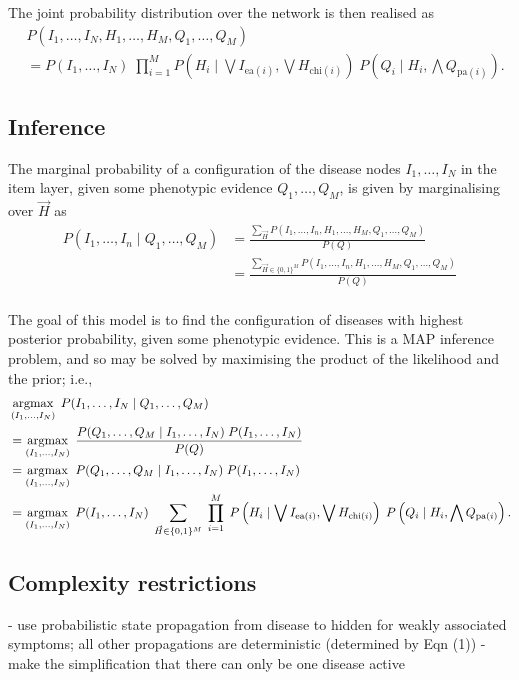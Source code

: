 The joint probability distribution over the network is then realised as
\begin{align}
    &P(I_1, \hdots, I_N, H_1, \hdots, H_M, Q_1, \hdots, Q_M) \nonumber\\
    &=  P(I_1, \hdots, I_N) 
    \; \prod_{i=1}^M P\left(H_i \mid \bigvee I_{\text{ea}(i)}, \bigvee H_{\text{chi}(i)}\right)
    \; P\left(Q_i \mid H_i, \bigwedge Q_{\text{pa}(i)}\right). \label{eq:joint}
\end{align}

\subsection*{Inference}

The marginal probability of a configuration of the disease nodes $I_1, \hdots, I_N$ in the item layer, given some phenotypic evidence $Q_1, \hdots, Q_M$, is given by marginalising over $\vec{H}$ as
\begin{align*}
    P(I_1, \hdots, I_n \mid Q_1, \hdots, Q_M)
    &= \frac{\sum_{\vec{H}} P(I_1, \hdots, I_n, H_1, \hdots, H_M, Q_1, \hdots, Q_M)}{P(Q)} \\
    &= \frac{\sum_{\vec{H} \in \{0, 1\}^M} P(I_1, \hdots, I_n, H_1, \hdots, H_M, Q_1, \hdots, Q_M)}{P(Q)} \\
\end{align*}

The goal of this model is to find the configuration of diseases with highest posterior probability, given some phenotypic evidence.
This is a MAP inference problem, and so may be solved by maximising the product of the likelihood and the prior; i.e.,
\begin{align*}
    &\argmax_{(I_1, \hdots, I_N)} \;
    P(I_1, \hdots, I_N \mid Q_1, \hdots, Q_M) \\
    &= \argmax_{(I_1, \hdots, I_N)} \;
    \frac{P(Q_1, \hdots, Q_M \mid I_1, \hdots, I_N )\; P(I_1, \hdots, I_N)}{P(Q)} \\
    &= \argmax_{(I_1, \hdots, I_N)} \;
    P(Q_1, \hdots, Q_M \mid I_1, \hdots, I_N )\; P(I_1, \hdots, I_N) \\
    &= \argmax_{(I_1, \hdots, I_N)} \;
    P(I_1, \hdots, I_N)
    \;\sum_{\vec{H} \in \{0, 1\}^M} \; \prod_{i=1}^M \; P\left(H_i \mid \bigvee I_{\text{ea}(i)}, \bigvee H_{\text{chi}(i)}\right)
    \; P\left(Q_i \mid H_i, \bigwedge Q_{\text{pa}(i)}\right).
\end{align*}

\subsection*{Complexity restrictions}

- use probabilistic state propagation from disease to hidden for weakly associated symptoms; all other propagations are deterministic (determined by Eqn (1))
- make the simplification that there can only be one disease active
